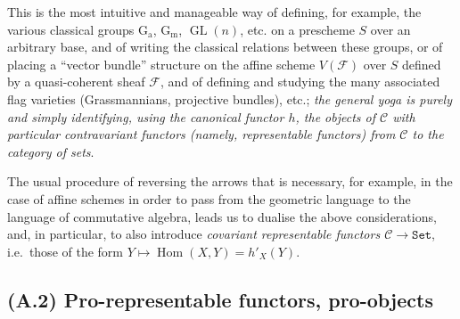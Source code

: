 \documentclass{article}
\newcommand{\oldpage}[1]{\marginpar{\footnotesize$\Big\vert$ \textit{p.~#1}}}
\theoremstyle{definition}
\theoremstyle{definition}
\theoremstyle{definition}
\theoremstyle{definition}
\theoremstyle{remark}
\begin{document}
This is the most intuitive and manageable way of defining, for example, the various classical groups \(\operatorname{G_a}\), \(\operatorname{G_m}\), \(\operatorname{GL}(n)\), etc. on a prescheme \(S\) over an arbitrary base, and of writing the classical relations between these groups, or of placing a ``vector bundle'' structure on the affine scheme \(V({\mathscr{F}})\) over \(S\) defined by a quasi-coherent sheaf \({\mathscr{F}}\), and of defining and studying the many associated flag varieties (Grassmannians, projective bundles), etc.;
\emph{the general yoga is purely and simply identifying, using the canonical functor \(h\), the objects of \({\mathcal{C}}\) with particular contravariant functors (namely, representable functors) from \({\mathcal{C}}\) to the category of sets}.

\oldpage{195-03}The usual procedure of reversing the arrows that is necessary, for example, in the case of affine schemes in order to pass from the geometric language to the language of commutative algebra, leads us to dualise the above considerations, and, in particular, to also introduce \emph{covariant representable functors \({\mathcal{C}}\to\mathtt{Set}\)}, i.e.~those of the form \(Y\mapsto\operatorname{Hom}(X,Y)=h'_X(Y)\).

\hypertarget{fga-3-ii-section-A.2}{%
\subsection{(A.2) Pro-representable functors, pro-objects}\label{fga-3-ii-section-A.2}}
\end{document}
